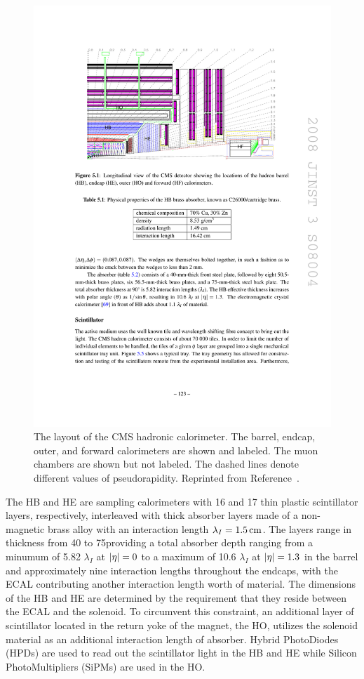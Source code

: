 \begin{figure}[htbp]
  \centering
  \includegraphics[width=\textwidth]{Detector/Figures/cms_hcal.pdf}
  \caption{
    The layout of the CMS hadronic calorimeter.
    The barrel, endcap, outer, and forward calorimeters are shown and labeled.
    The muon chambers are shown but not labeled. 
    The dashed lines denote different values of pseudorapidity.
    Reprinted from Reference~\cite{CMS2008}. 
  }
  \label{fig:cms_hcal}
\end{figure}

The HB and HE are sampling calorimeters with 16 and 17 thin plastic scintillator layers, respectively,  interleaved with thick absorber layers made of a non-magnetic brass alloy with an interaction length $\lambda_I = 1.5\,\text{cm}$.
The layers range in thickness from 40 to 75\mm providing a total absorber depth ranging from a minumum of 5.82 $\lambda_I$ at $\lvert \eta \rvert=0$ to a maximum of 10.6 $\lambda_I$ at $\lvert \eta \rvert = 1.3$ in the barrel and approximately nine interaction lengths throughout the endcaps, with the ECAL contributing another interaction length worth of material.
The dimensions of the HB and HE are determined by the requirement that they reside between the ECAL and the solenoid. 
To circumvent this constraint, an additional layer of scintillator located in the return yoke of the magnet, the HO, utilizes the solenoid material as an additional interaction length of absorber.
Hybrid PhotoDiodes (HPDs) are used to read out the scintillator light in the HB and HE while Silicon PhotoMultipliers (SiPMs) are used in the HO.

